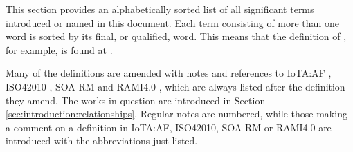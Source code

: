 %
%

This section provides an alphabetically sorted list of all significant terms introduced or named in this document.
Each term consisting of more than one word is sorted by its final, or qualified, word.
This means that the definition of , for example, is found at .

Many of the definitions are amended with notes and references to IoTA:AF \cite{delsing2017iot}, ISO42010 \cite{iso42010}, SOA-RM \cite{mackenzie2006reference} and RAMI4.0 \cite{adolphs2016reference}, which are always listed after the definition they amend.
The works in question are introduced in Section \ref{sec:introduction:relationships}.
Regular notes are numbered, while those making a comment on a definition in IoTA:AF, ISO42010, SOA-RM or RAMI4.0 are introduced with the abbreviations just listed.

